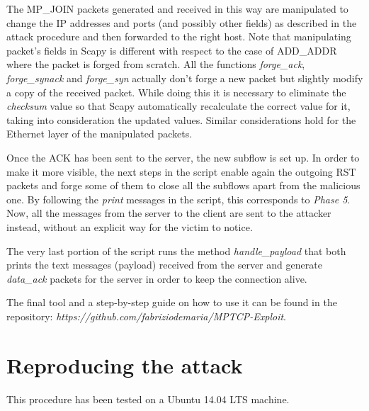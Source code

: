 The MP\_JOIN packets generated and received in this way are manipulated to change the IP addresses and ports (and possibly other fields) as described in the attack procedure and then forwarded to the right host. Note that manipulating packet's fields in Scapy is different with respect to the case of ADD\_ADDR where the packet is forged from scratch. All the functions \textit{forge\_ack}, \textit{forge\_synack} and \textit{forge\_syn} actually don't forge a new packet but slightly modify a copy of the received packet. While doing this it is necessary to eliminate the \textit{checksum} value so that Scapy automatically recalculate the correct value for it, taking into consideration the updated values. Similar considerations hold for the Ethernet layer of the manipulated packets. 

Once the ACK has been sent to the server, the new subflow is set up. In order to make it more visible, the next steps in the script enable again the outgoing RST packets and forge some of them to close all the subflows apart from the malicious one. By following the \textit{print} messages in the script, this corresponds to \textit{Phase 5}. Now, all the messages from the server to the client are sent to the attacker instead, without an explicit way for the victim to notice. 

The very last portion of the script runs the method \textit{handle\_payload} that both prints the text messages (payload) received from the server and generate \textit{data\_ack} packets for the server in order to keep the connection alive. 

The final tool and a step-by-step guide on how to use it can be found in the repository: \textit{https://github.com/fabriziodemaria/MPTCP-Exploit}.

\section{Reproducing the attack}
This procedure has been tested on a Ubuntu 14.04 LTS machine.

